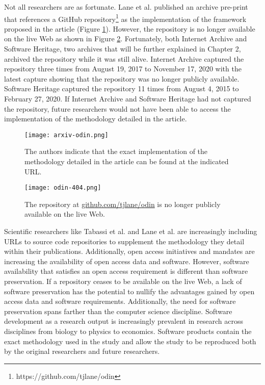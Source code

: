 Not all researchers are as fortunate. Lane et al. published an archive pre-print that references a GitHub repository\footnote{https://github.com/tjlane/odin} as the implementation of the framework proposed in the article (Figure \ref{fig:arxiv-odin}). However, the repository is no longer available on the live Web as shown in Figure \ref{fig:odin-404}. Fortunately, both Internet Archive and Software Heritage, two archives that will be further explained in Chapter 2, archived the repository while it was still alive. Internet Archive captured the repository three times from August 19, 2017 to November 17, 2020 with the latest capture showing that the repository was no longer publicly available. Software Heritage captured the repository 11 times from August 4, 2015 to February 27, 2020. If Internet Archive and Software Heritage had not captured the repository, future researchers would not have been able to access the implementation of the methodology detailed in the article. 

\begin{figure}
    \centering
    \texttt{[image: arxiv-odin.png]}
    \caption{The authors indicate that the exact implementation of the methodology detailed in the article can be found at the indicated URL.}
    \label{fig:arxiv-odin}
\end{figure}

\begin{figure}
    \centering
    \texttt{[image: odin-404.png]}
    \caption{The repository at \url{github.com/tjlane/odin} is no longer publicly available on the live Web.}
    \label{fig:odin-404}
\end{figure}

Scientific researchers like Tabassi et al. and Lane et al. are increasingly including URLs to source code repositories to supplement the methodology they detail within their publications. Additionally, open access initiatives and mandates are increasing the availability of open access data and software. However, software availability that satisfies an open access requirement is different than software preservation. If a repository ceases to be available on the live Web, a lack of software preservation has the potential to nullify the advantages gained by open access data and software requirements. Additionally, the need for software preservation spans farther than the computer science discipline. Software development as a research output is increasingly prevalent in research across disciplines from biology to physics to economics. Software products contain the exact methodology used in the study and allow the study to be reproduced both by the original researchers and future researchers.

